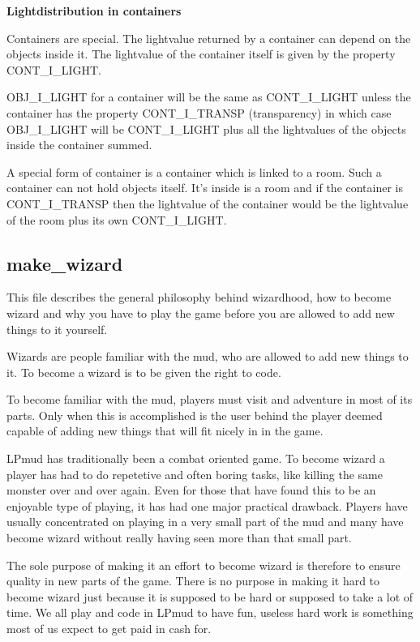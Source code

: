 {\bf Lightdistribution in containers}


Containers are special. The lightvalue returned by a container can
depend on the objects inside it. The lightvalue of the container
itself is given by the property CONT\_I\_LIGHT.

OBJ\_I\_LIGHT for a container will be the same as CONT\_I\_LIGHT unless the
container has the property CONT\_I\_TRANSP (transparency) in which case
OBJ\_I\_LIGHT will be CONT\_I\_LIGHT plus all the lightvalues of the objects
inside the container summed.

A special form of container is a container which is linked to a room.
Such a container can not hold objects itself. It's inside is a room
and if the container is CONT\_I\_TRANSP then the lightvalue of the
container would be the lightvalue of the room plus its own CONT\_I\_LIGHT.

\subsection{make\_wizard}

This file describes the general philosophy behind wizardhood, how to
become wizard and why you have to play the game before you are allowed
to add new things to it yourself.

Wizards are people familiar with the mud, who are allowed to add new
things to it. To become a wizard is to be given the right to code.

To become familiar with the mud, players must visit and adventure in most 
of its parts. Only when this is accomplished is the user behind the player
deemed capable of adding new things that will fit nicely in in the game.

LPmud has traditionally been a combat oriented game. To become wizard a
player has had to do repetetive and often boring tasks, like killing the
same monster over and over again. Even for those that have found this to
be an enjoyable type of playing, it has had one major practical drawback.
Players have usually concentrated on playing in a very small part of the mud
and many have become wizard without really having seen more than that
small part. 

The sole purpose of making it an effort to become wizard is therefore to
ensure quality in new parts of the game. There is no purpose in making it
hard to become wizard just because it is supposed to be hard or supposed
to take a lot of time. We all play and code in LPmud to have fun, useless
hard work is something most of us expect to get paid in cash for.

